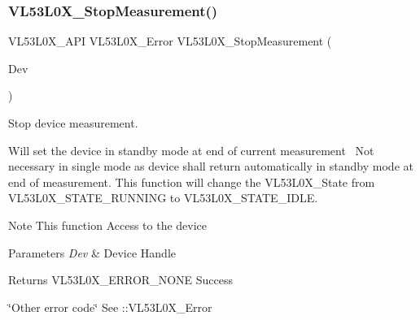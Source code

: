 \subsubsection{\texorpdfstring{V\+L53\+L0\+X\+\_\+\+Stop\+Measurement()}{VL53L0X\_StopMeasurement()}}
{\footnotesize\ttfamily V\+L53\+L0\+X\+\_\+\+A\+PI V\+L53\+L0\+X\+\_\+\+Error V\+L53\+L0\+X\+\_\+\+Stop\+Measurement (\begin{DoxyParamCaption}\item[{\hyperlink{group__VL53L0X__platform__group_ga2d6405308b1dd524b462f1b8fb97d167}{V\+L53\+L0\+X\+\_\+\+D\+EV}}]{Dev }\end{DoxyParamCaption})}



Stop device measurement. 

Will set the device in standby mode at end of current measurement~\newline
 Not necessary in single mode as device shall return automatically in standby mode at end of measurement. This function will change the V\+L53\+L0\+X\+\_\+\+State from V\+L53\+L0\+X\+\_\+\+S\+T\+A\+T\+E\+\_\+\+R\+U\+N\+N\+I\+NG to V\+L53\+L0\+X\+\_\+\+S\+T\+A\+T\+E\+\_\+\+I\+D\+LE.

\begin{DoxyNote}{Note}
This function Access to the device
\end{DoxyNote}

\begin{DoxyParams}{Parameters}
{\em Dev} & Device Handle \\
\hline
\end{DoxyParams}
\begin{DoxyReturn}{Returns}
V\+L53\+L0\+X\+\_\+\+E\+R\+R\+O\+R\+\_\+\+N\+O\+NE Success 

\char`\"{}\+Other error code\char`\"{} See \+::\+V\+L53\+L0\+X\+\_\+\+Error 
\end{DoxyReturn}
\mbox{\label{group__VL53L0X__measurement__group_ga36e842f2f53c046d0f3a5e53f37113c3}} 
